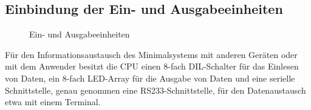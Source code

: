 \subsection{Einbindung der Ein- und Ausgabeeinheiten}
\begin{figure}[htb]
    \centering
    \qquad
    \qquad
    \qquad
    \caption[Z80 Ein-/Ausgabeeinheiten]{Ein- und Ausgabeeinheiten}
    \label{fig:z80-io}
\end{figure}
Für den Informationsaustausch des Minimalsystems mit anderen Geräten oder mit dem Anwender besitzt die CPU einen 8-fach DIL-Schalter für das Einlesen von Daten, ein 8-fach LED-Array für die Ausgabe von Daten und eine serielle Schnittstelle, genau genommen eine RS233-Schnittstelle, für den Datenaustausch etwa mit einem Terminal.

